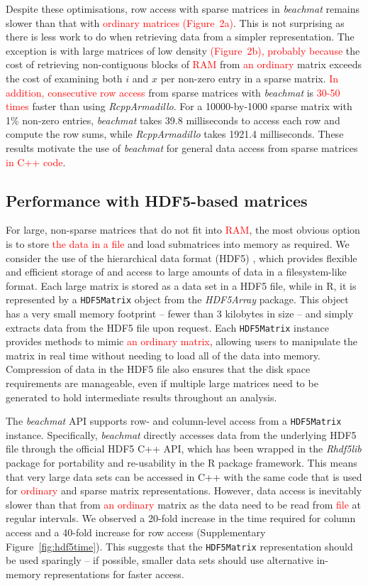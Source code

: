 \documentclass{article}
\newcommand{\beachmat}{\textit{beachmat}}
\newcommand{\code}[1]{\texttt{#1}}
\newcommand{\revised}[1]{\textcolor{red}{#1}}
\begin{document}
Despite these optimisations, row access with sparse matrices in \beachmat{} remains slower than that with \revised{ordinary matrices (Figure~2a)}.
This is not surprising as there is less work to do when retrieving data from a simpler representation.
The exception is with large matrices of low density \revised{(Figure~2b), probably because} the cost of retrieving non-contiguous blocks of \revised{RAM} from \revised{an ordinary} matrix exceeds the cost of examining both $i$ and $x$ per non-zero entry in a sparse matrix.
\revised{In addition, consecutive row access} from sparse matrices with \beachmat{} is \revised{30-50 times} faster than using \textit{RcppArmadillo}.
For a 10000-by-1000 sparse matrix with 1\% non-zero entries, \beachmat{} takes 39.8 milliseconds to access each row and compute the row sums, while \textit{RcppArmadillo} takes 1921.4 milliseconds.
These results motivate the use of \beachmat{} for general data access from sparse matrices \revised{in C++ code}.

\subsection{Performance with HDF5-based matrices}
For large, non-sparse matrices that do not fit into \revised{RAM}, the most obvious option is to store \revised{the data in a file} and load submatrices into memory as required.
We consider the use of the hierarchical data format (HDF5) \cite{hdf5}, which provides flexible and efficient storage of and access to large amounts of data in a filesystem-like format.
Each large matrix is stored as a data set in a HDF5 file, while in R, it is represented by a \code{HDF5Matrix} object from the \textit{HDF5Array} package.
This object has a very small memory footprint -- fewer than 3 kilobytes in size -- and simply extracts data from the HDF5 file upon request.
Each \code{HDF5Matrix} instance provides methods to mimic \revised{an ordinary matrix}, allowing users to manipulate the matrix in real time without needing to load all of the data into memory.
Compression of data in the HDF5 file also ensures that the disk space requirements are manageable, even if multiple large matrices need to be generated to hold intermediate results throughout an analysis.

The \beachmat{} API supports row- and column-level access from a \code{HDF5Matrix} instance.
Specifically, \beachmat{} directly accesses data from the underlying HDF5 file through the official HDF5 C++ API, which has been wrapped in the \textit{Rhdf5lib} package for portability and re-usability in the R package framework.
This means that very large data sets can be accessed in C++ with the same code that is used for \revised{ordinary} and sparse matrix representations.
However, data access is inevitably slower than that from \revised{an ordinary} matrix as the data need to be read from \revised{file} at regular intervals.
We observed a 20-fold increase in the time required for column access and a 40-fold increase for row access (Supplementary Figure~\ref{fig:hdf5time}).
This suggests that the \code{HDF5Matrix} representation should be used sparingly -- if possible, smaller data sets should use alternative in-memory representations for faster access.
\end{document}

